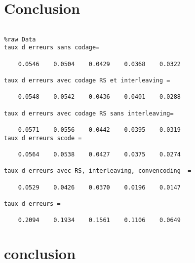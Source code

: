 \documentclass[a4paper,10pt]{article}
\begin{document}
\section{Conclusion}


\newpage

\begin{verbatim}

%raw Data
taux d erreurs sans codage=

    0.0546    0.0504    0.0429    0.0368    0.0322

taux d erreurs avec codage RS et interleaving =

    0.0548    0.0542    0.0436    0.0401    0.0288

taux d erreurs avec codage RS sans interleaving=

    0.0571    0.0556    0.0442    0.0395    0.0319
taux d erreurs scode =

    0.0564    0.0538    0.0427    0.0375    0.0274

taux d erreurs avec RS, interleaving, convencoding  =

    0.0529    0.0426    0.0370    0.0196    0.0147

taux d erreurs =

    0.2094    0.1934    0.1561    0.1106    0.0649

\end{verbatim}


\begin{center}
\end{center}
\section{conclusion}
\end{document}
